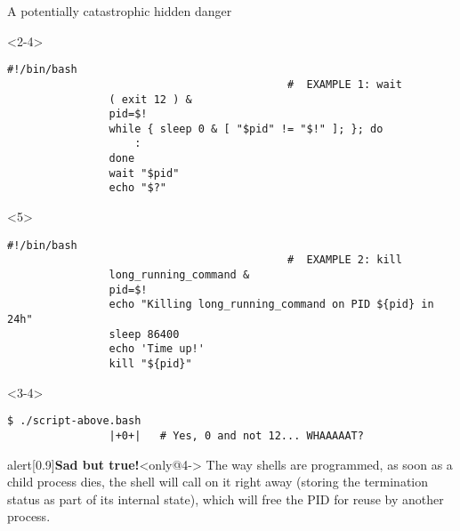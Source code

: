 \begin{frame}[fragile]{A potentially catastrophic hidden danger}
    \begin{overlayarea}{\textwidth}{0.5\textheight}
        \begin{onlyenv}<2-4>
            \begin{lstlisting}[style=MyBash]
                #!/bin/bash
                                            #  EXAMPLE 1: wait
                ( exit 12 ) &
                pid=$!
                while { sleep 0 & [ "$pid" != "$!" ]; }; do
                    :
                done
                wait "$pid"
                echo "$?"
            \end{lstlisting}
        \end{onlyenv}
        \begin{onlyenv}<5>
            \begin{lstlisting}[style=MyBash, emph={[8]long_running_command}, firstnumber=10]
                #!/bin/bash
                                            #  EXAMPLE 2: kill
                long_running_command &
                pid=$!
                echo "Killing long_running_command on PID ${pid} in 24h"
                sleep 86400
                echo 'Time up!'
                kill "${pid}"
            \end{lstlisting}
            \begin{center}
                \Large {}
            \end{center}
        \end{onlyenv}
        \begin{uncoverenv}<3-4>
            \begin{lstlisting}[style=MyBash, numbers=none, aboveskip=1mm]
                $ ./script-above.bash
                |+0+|   # Yes, 0 and not 12... WHAAAAAT?
            \end{lstlisting}
        \end{uncoverenv}
        \begin{center}
        \end{center}
    \end{overlayarea}
    \begin{varblock}{alert}[0.9\textwidth]{\textbf{Sad but true!}}<only@4->
        The way shells are programmed, as soon as a child process dies, the shell will call  on it right away (storing the termination status as part of its internal state), which will free the PID for reuse by another process.
    \end{varblock}
\end{frame}
